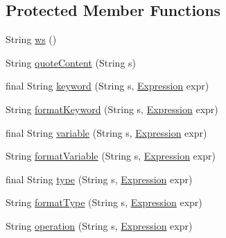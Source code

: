 \subsection*{Protected Member Functions}
\begin{DoxyCompactItemize}
\item 
String \hyperlink{classorg_1_1tzi_1_1use_1_1uml_1_1ocl_1_1expr_1_1_expression_print_visitor_a464d59174024883527210ab1a9e89506}{ws} ()
\item 
String \hyperlink{classorg_1_1tzi_1_1use_1_1uml_1_1ocl_1_1expr_1_1_expression_print_visitor_a120683d244a4946431025eedadbbf8bf}{quote\-Content} (String s)
\item 
final String \hyperlink{classorg_1_1tzi_1_1use_1_1uml_1_1ocl_1_1expr_1_1_expression_print_visitor_acaa997c3af5cda76bf6afbd1db4c9e33}{keyword} (String s, \hyperlink{classorg_1_1tzi_1_1use_1_1uml_1_1ocl_1_1expr_1_1_expression}{Expression} expr)
\item 
String \hyperlink{classorg_1_1tzi_1_1use_1_1uml_1_1ocl_1_1expr_1_1_expression_print_visitor_a6320f1d74f63871fb062cc9a41efd65c}{format\-Keyword} (String s, \hyperlink{classorg_1_1tzi_1_1use_1_1uml_1_1ocl_1_1expr_1_1_expression}{Expression} expr)
\item 
final String \hyperlink{classorg_1_1tzi_1_1use_1_1uml_1_1ocl_1_1expr_1_1_expression_print_visitor_aa93d051f20182a41ca2afefecfc12bc9}{variable} (String s, \hyperlink{classorg_1_1tzi_1_1use_1_1uml_1_1ocl_1_1expr_1_1_expression}{Expression} expr)
\item 
String \hyperlink{classorg_1_1tzi_1_1use_1_1uml_1_1ocl_1_1expr_1_1_expression_print_visitor_a4a1d0d83f1d51deb52406d9df168f4b7}{format\-Variable} (String s, \hyperlink{classorg_1_1tzi_1_1use_1_1uml_1_1ocl_1_1expr_1_1_expression}{Expression} expr)
\item 
final String \hyperlink{classorg_1_1tzi_1_1use_1_1uml_1_1ocl_1_1expr_1_1_expression_print_visitor_a5abb7b95757e753982a4f598b077a231}{type} (String s, \hyperlink{classorg_1_1tzi_1_1use_1_1uml_1_1ocl_1_1expr_1_1_expression}{Expression} expr)
\item 
String \hyperlink{classorg_1_1tzi_1_1use_1_1uml_1_1ocl_1_1expr_1_1_expression_print_visitor_a72d10a0a82cd1de4f4fd4e408428690c}{format\-Type} (String s, \hyperlink{classorg_1_1tzi_1_1use_1_1uml_1_1ocl_1_1expr_1_1_expression}{Expression} expr)
\item 
String \hyperlink{classorg_1_1tzi_1_1use_1_1uml_1_1ocl_1_1expr_1_1_expression_print_visitor_a96b49655d1a7706c640afe24b3bffbee}{operation} (String s, \hyperlink{classorg_1_1tzi_1_1use_1_1uml_1_1ocl_1_1expr_1_1_expression}{Expression} expr)

\end{DoxyCompactItemize}
